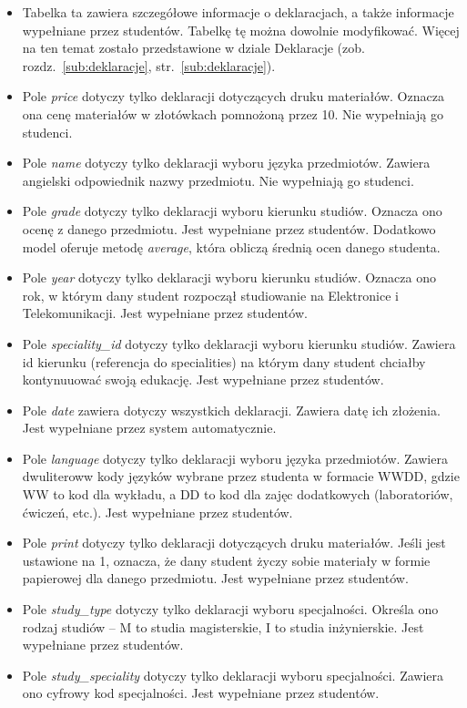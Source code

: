 \documentclass[a4paper,12pt,oneside]{report}
\begin{document}
\begin{itemize}
  \item Tabelka ta zawiera szczegółowe informacje o deklaracjach, a także informacje wypełniane przez studentów. Tabelkę tę można dowolnie modyfikować. Więcej na ten temat zostało przedstawione w dziale Deklaracje (zob. rozdz.~\ref{sub:deklaracje}, str.~\ref{sub:deklaracje}).
  \item Pole \emph{price} dotyczy tylko deklaracji dotyczących druku materiałów. Oznacza ona cenę materiałów w złotówkach pomnożoną przez 10. Nie wypełniają go studenci.
  \item Pole \emph{name} dotyczy tylko deklaracji wyboru języka przedmiotów. Zawiera angielski odpowiednik nazwy przedmiotu. Nie wypełniają go studenci.
  \item Pole \emph{grade} dotyczy tylko deklaracji wyboru kierunku studiów. Oznacza ono ocenę z danego przedmiotu. Jest wypełniane przez studentów. Dodatkowo model oferuje metodę \emph{average}, która obliczą średnią ocen danego studenta.
  \item Pole \emph{year} dotyczy tylko deklaracji wyboru kierunku studiów. Oznacza ono rok, w którym dany student rozpoczął studiowanie na Elektronice i Telekomunikacji. Jest wypełniane przez studentów.
  \item Pole \emph{speciality\_id} dotyczy tylko deklaracji wyboru kierunku studiów. Zawiera id kierunku (referencja do specialities) na którym dany student chciałby kontynuuować swoją edukację. Jest wypełniane przez studentów.
  \item Pole \emph{date} zawiera dotyczy wszystkich deklaracji. Zawiera datę ich złożenia. Jest wypełniane przez system automatycznie.
  \item Pole \emph{language} dotyczy tylko deklaracji wyboru języka przedmiotów. Zawiera dwuliteroww kody języków wybrane przez studenta w formacie WWDD, gdzie WW to kod dla wykładu, a DD to kod dla zajęc dodatkowych (laboratoriów, ćwiczeń, etc.). Jest wypełniane przez studentów.
  \item Pole \emph{print} dotyczy tylko deklaracji dotyczących druku materiałów. Jeśli jest ustawione na 1, oznacza, że dany student życzy sobie materiały w formie papierowej dla danego przedmiotu. Jest wypełniane przez studentów.
  \item Pole \emph{study\_type} dotyczy tylko deklaracji wyboru specjalności. Określa ono rodzaj studiów -- M to studia magisterskie, I to studia inżynierskie. Jest wypełniane przez studentów.
  \item Pole \emph{study\_speciality} dotyczy tylko deklaracji wyboru specjalności. Zawiera ono cyfrowy kod specjalności. Jest wypełniane przez studentów.
\end{itemize}
\end{document}
